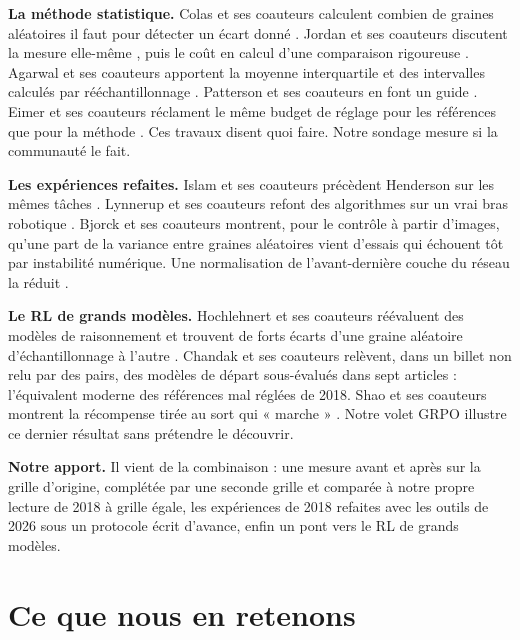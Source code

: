 \documentclass[11pt,a4paper]{article}
\begin{document}
\textbf{La méthode statistique.} Colas et ses coauteurs calculent
combien de graines aléatoires il faut pour détecter un écart donné
\autocite{colas2018seeds}. Jordan et ses coauteurs discutent la mesure
elle-même \autocite{jordan2020evaluating}, puis le coût en calcul d'une
comparaison rigoureuse \autocite{jordan2024position}. Agarwal et ses
coauteurs apportent la moyenne interquartile et des intervalles calculés
par rééchantillonnage \autocite{agarwal2021precipice}. Patterson et ses
coauteurs en font un guide \autocite{patterson2024empirical}. Eimer et
ses coauteurs réclament le même budget de réglage pour les références
que pour la méthode \autocite{eimer2023hyperparameters}. Ces travaux
disent quoi faire. Notre sondage mesure si la communauté le fait.

\textbf{Les expériences refaites.} Islam et ses coauteurs précèdent
Henderson sur les mêmes tâches \autocite{islam2017reproducibility}.
Lynnerup et ses coauteurs refont des algorithmes sur un vrai bras
robotique \autocite{lynnerup2020survey}. Bjorck et ses coauteurs
montrent, pour le contrôle à partir d'images, qu'une part de la variance
entre graines aléatoires vient d'essais qui échouent tôt par instabilité
numérique. Une normalisation de l'avant-dernière couche du réseau la
réduit \autocite{bjorck2022variance}.

\textbf{Le RL de grands modèles.} Hochlehnert et ses coauteurs
réévaluent des modèles de raisonnement et trouvent de forts écarts d'une
graine aléatoire d'échantillonnage à l'autre
\autocite{hochlehnert2025sober}. Chandak et ses coauteurs relèvent, dans
un billet non relu par des pairs, des modèles de départ sous-évalués
dans sept articles \autocite{chandak2025incorrect} : l'équivalent
moderne des références mal réglées de 2018. Shao et ses coauteurs
montrent la récompense tirée au sort qui « marche »
\autocite{shao2025spurious}. Notre volet GRPO illustre ce dernier
résultat sans prétendre le découvrir.

\textbf{Notre apport.} Il vient de la combinaison : une mesure avant et
après sur la grille d'origine, complétée par une seconde grille et
comparée à notre propre lecture de 2018 à grille égale, les expériences
de 2018 refaites avec les outils de 2026 sous un protocole écrit
d'avance, enfin un pont vers le RL de grands modèles.

\section{Ce que nous en retenons}\label{ce-que-nous-en-retenons}
\end{document}
